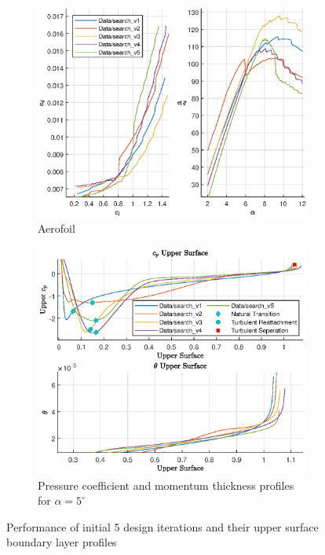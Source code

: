 \documentclass{article}
\begin{document}
\begin{figure}[H]
    \centering
    \begin{subfigure}{0.45\textwidth}
        \centering
        \includegraphics[width=1.2\textwidth, center]{figures/hiRe_lod_5.eps}
        \caption{Aerofoil}
        \label{fig:v5_lod}
    \end{subfigure}
    \begin{subfigure}{0.54\textwidth}
        \centering
        \includegraphics[width=0.99\textwidth]{figures/hiRe_upperprofile_5_a5.eps}
        \caption{Pressure coefficient and momentum thickness profiles for $\alpha = 5^\circ$}
        \label{fig:v5_uprofile}
    \end{subfigure}
    \caption{Performance of initial 5 design iterations and their upper surface boundary layer profiles}
\end{figure}
\end{document}
